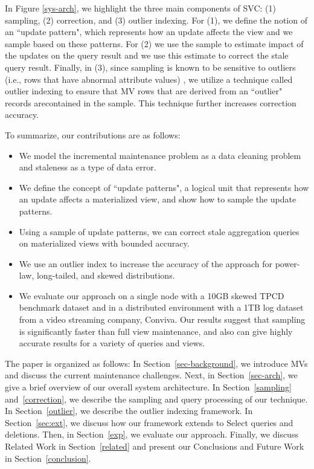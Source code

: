 In Figure \ref{sys-arch}, we highlight the three main components of SVC: (1) sampling, (2) correction, and (3) outlier indexing. For (1), we define the notion of an ``update pattern", which represents how an update affects the view and we sample based on these patterns. For (2) we use the sample to estimate impact of the updates on the query result and we use this estimate to correct the stale query result.
Finally, in (3), since sampling is known to be sensitive to outliers (i.e., rows that have abnormal attribute values) \cite{chaudhuri2001overcoming}, we
utilize a technique called outlier indexing \cite{chaudhuri2001overcoming} to ensure that MV rows that are derived from an ``outlier" records arecontained in the sample.  This technique further increases correction accuracy.

To summarize, our contributions are as follows:
\begin{itemize}\vspace{-.45em}
\item We model the incremental maintenance problem as a data cleaning problem and staleness as a type of data error.\vspace{-.45em}
\item We define the concept of ``update patterns", a logical unit that represents how an update affects a materialized view, and show how to sample the update patterns. \vspace{-.45em}
\item Using a sample of update patterns, we can correct stale aggregation queries on materialized views with bounded accuracy.\vspace{-.45em}
\item We use an outlier index to increase the accuracy of the approach for power-law, long-tailed, and skewed distributions.\vspace{-.45em}
\item We evaluate our approach on a single node with a 10GB skewed TPCD benchmark dataset and in a distributed environment with a 1TB log dataset from a video streaming company, Conviva. Our results suggest that sampling is significantly faster than full view maintenance, and also can give highly accurate results for a variety of queries and views.\vspace{-.45em}
\end{itemize}

The paper is organized as follows: 
In Section~\ref{sec-background}, we introduce MVs and discuss the current maintenance challenges.
Next, in Section~\ref{sec-arch}, we give a brief overview of our overall system architecture.
In Section~\ref{sampling} and~\ref{correction}, we describe the sampling and query processing of our technique.
In Section~\ref{outlier}, we describe the outlier indexing framework.
In Section~\ref{sec:ext}, we discuss how our framework extends to Select queries and deletions.
Then, in Section~\ref{exp}, we evaluate our approach.
Finally, we discuss Related Work in Section~\ref{related} and present our Conclusions and Future Work in Section~\ref{conclusion}.
